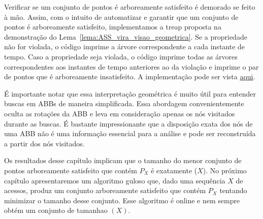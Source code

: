 Verificar se um conjunto de pontos é arboreamente satisfeito é demorado se feito à mão. Assim, com o intuito de automatizar e garantir que um conjunto de pontos é arboreamente satisfeito, implementamos a treap proposta na demonstração do Lema~\ref{lema:ASS_vira_visao_geometrica}. %
Se a propriedade não for violada, o código imprime a árvore correspondente a cada instante de tempo. Caso a propriedade seja violada, o código imprime todas as árvores correspondentes aos instantes de tempo anteriores ao da violação e imprime o par de pontos que é arboreamente insatisfeito. A implementação pode ser vista \href{https://github.com/BrunoArmondBraga/TCC/blob/main/src/ValidAss.cpp}{aqui}.

É importante notar que essa interpretação geométrica é muito útil para entender buscas em ABBs de maneira simplificada. Essa abordagem convenientemente oculta as rotações da ABB e leva em consideração apenas os nós visitados durante as buscas. É bastante impressionante que a disposição exata dos nós de uma ABB não é uma informação essencial para a análise e pode ser reconstruída a partir dos nós visitados.

Os resultados desse capítulo implicam que o tamanho do menor conjunto de pontos arboreamente satisfeito que contém $P_X$ é exatamente \OPT($X$). No próximo capítulo apresentaremos um algoritmo guloso que, dado uma sequência $X$ de acessos, produz um conjunto arboreamente satisfeito que contém $P_X$ tentando minimizar o tamanho desse conjunto. Esse algoritmo é online e nem sempre obtém um conjunto de tamanhao \OPT$(X)$.